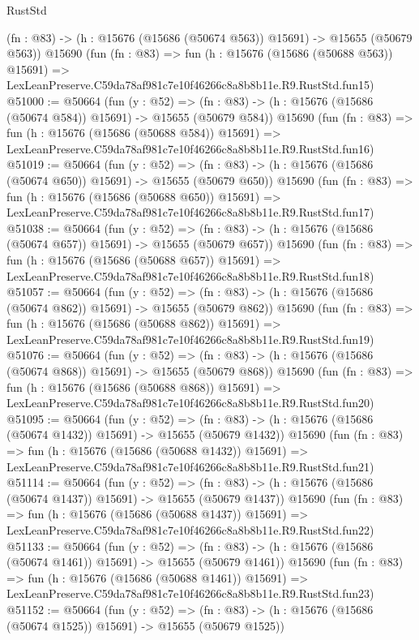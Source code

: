 \begin{lexlean}{RustStd}
\begin{coremodule}
    (fn : @83) -> (h : @15676 (@15686 (@50674 @563)) @15691) -> @15655 (@50679 @563))
    @15690
    (fun (fn : @83) =>
    fun (h : @15676 (@15686 (@50688 @563)) @15691) =>
    LexLeanPreserve.C59da78af981c7e10f46266c8a8b8b11e.R9.RustStd.fun15)
@51000 := @50664
    (fun (y : @52) =>
    (fn : @83) -> (h : @15676 (@15686 (@50674 @584)) @15691) -> @15655 (@50679 @584))
    @15690
    (fun (fn : @83) =>
    fun (h : @15676 (@15686 (@50688 @584)) @15691) =>
    LexLeanPreserve.C59da78af981c7e10f46266c8a8b8b11e.R9.RustStd.fun16)
@51019 := @50664
    (fun (y : @52) =>
    (fn : @83) -> (h : @15676 (@15686 (@50674 @650)) @15691) -> @15655 (@50679 @650))
    @15690
    (fun (fn : @83) =>
    fun (h : @15676 (@15686 (@50688 @650)) @15691) =>
    LexLeanPreserve.C59da78af981c7e10f46266c8a8b8b11e.R9.RustStd.fun17)
@51038 := @50664
    (fun (y : @52) =>
    (fn : @83) -> (h : @15676 (@15686 (@50674 @657)) @15691) -> @15655 (@50679 @657))
    @15690
    (fun (fn : @83) =>
    fun (h : @15676 (@15686 (@50688 @657)) @15691) =>
    LexLeanPreserve.C59da78af981c7e10f46266c8a8b8b11e.R9.RustStd.fun18)
@51057 := @50664
    (fun (y : @52) =>
    (fn : @83) -> (h : @15676 (@15686 (@50674 @862)) @15691) -> @15655 (@50679 @862))
    @15690
    (fun (fn : @83) =>
    fun (h : @15676 (@15686 (@50688 @862)) @15691) =>
    LexLeanPreserve.C59da78af981c7e10f46266c8a8b8b11e.R9.RustStd.fun19)
@51076 := @50664
    (fun (y : @52) =>
    (fn : @83) -> (h : @15676 (@15686 (@50674 @868)) @15691) -> @15655 (@50679 @868))
    @15690
    (fun (fn : @83) =>
    fun (h : @15676 (@15686 (@50688 @868)) @15691) =>
    LexLeanPreserve.C59da78af981c7e10f46266c8a8b8b11e.R9.RustStd.fun20)
@51095 := @50664
    (fun (y : @52) =>
    (fn : @83) -> (h : @15676 (@15686 (@50674 @1432)) @15691) -> @15655 (@50679 @1432))
    @15690
    (fun (fn : @83) =>
    fun (h : @15676 (@15686 (@50688 @1432)) @15691) =>
    LexLeanPreserve.C59da78af981c7e10f46266c8a8b8b11e.R9.RustStd.fun21)
@51114 := @50664
    (fun (y : @52) =>
    (fn : @83) -> (h : @15676 (@15686 (@50674 @1437)) @15691) -> @15655 (@50679 @1437))
    @15690
    (fun (fn : @83) =>
    fun (h : @15676 (@15686 (@50688 @1437)) @15691) =>
    LexLeanPreserve.C59da78af981c7e10f46266c8a8b8b11e.R9.RustStd.fun22)
@51133 := @50664
    (fun (y : @52) =>
    (fn : @83) -> (h : @15676 (@15686 (@50674 @1461)) @15691) -> @15655 (@50679 @1461))
    @15690
    (fun (fn : @83) =>
    fun (h : @15676 (@15686 (@50688 @1461)) @15691) =>
    LexLeanPreserve.C59da78af981c7e10f46266c8a8b8b11e.R9.RustStd.fun23)
@51152 := @50664
    (fun (y : @52) =>
    (fn : @83) -> (h : @15676 (@15686 (@50674 @1525)) @15691) -> @15655 (@50679 @1525))

\end{coremodule}
\end{lexlean}

